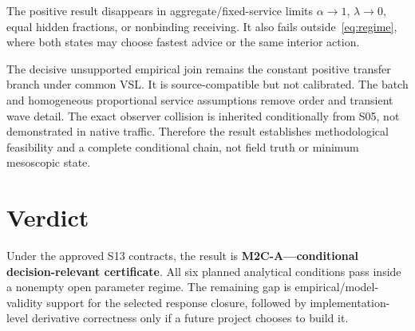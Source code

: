 \documentclass[11pt]{article}
\begin{document}
The positive result disappears in aggregate/fixed-service limits
\(\alpha\to1\), \(\lambda\to0\), equal hidden fractions, or nonbinding receiving.
It also fails outside~\eqref{eq:regime}, where both states may choose fastest
advice or the same interior action.

The decisive unsupported empirical join remains the constant positive transfer
branch under common VSL. It is source-compatible but not calibrated. The batch
and homogeneous proportional service assumptions remove order and transient
wave detail. The exact observer collision is inherited conditionally from S05,
not demonstrated in native traffic. Therefore the result establishes
methodological feasibility and a complete conditional chain, not field truth or
minimum mesoscopic state.

\section{Verdict}

Under the approved S13 contracts, the result is
\textbf{M2C-A---conditional decision-relevant certificate}. All six planned
analytical conditions pass inside a nonempty open parameter regime. The
remaining gap is empirical/model-validity support for the selected response
closure, followed by implementation-level derivative correctness only if a
future project chooses to build it.
\end{document}
